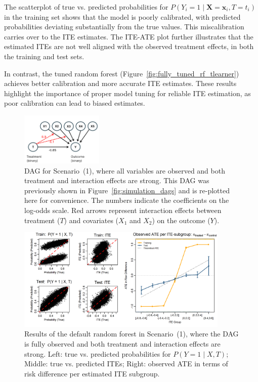 The scatterplot of true vs. predicted probabilities for $P(Y_i = 1 \mid \mathbf{X} = \mathbf{x}_i, T = t_i)$ in the training set shows that the model is poorly calibrated, with predicted probabilities deviating substantially from the true values. This miscalibration carries over to the ITE estimates. The ITE-ATE plot further illustrates that the estimated ITEs are not well aligned with the observed treatment effects, in both the training and test sets.

In contrast, the tuned random forest (Figure~\ref{fig:fully_tuned_rf_tlearner}) achieves better calibration and more accurate ITE estimates. These results highlight the importance of proper model tuning for reliable ITE estimation, as poor calibration can lead to biased estimates.



\begin{figure}[htbp]
\centering
\includegraphics[width=0.35\textwidth]{img/results_ITE_simulation/simulation_observed.png}
\caption{DAG for Scenario~(1), where all variables are observed and both treatment and interaction effects are strong. This DAG was previously shown in Figure~\ref{fig:simulation_dags} and is re-plotted here for convenience. The numbers indicate the coefficients on the log-odds scale. Red arrows represent interaction effects between treatment ($T$) and covariates ($X_1$ and $X_2$) on the outcome ($Y$).}
\label{fig:fully_observed_dag_rf_appendix}
\end{figure}


\begin{figure}[htbp]
\centering
\includegraphics[width=0.9\textwidth]{img/results_ITE_simulation/fully_observed_rf_tlearner.png}
\caption{Results of the default random forest in Scenario~(1), where the DAG is fully observed and both treatment and interaction effects are strong. Left: true vs. predicted probabilities for $P(Y = 1 \mid X, T)$; Middle: true vs. predicted ITEs; Right: observed ATE in terms of risk difference per estimated ITE subgroup.}
\label{fig:fully_observed_rf}
\end{figure}




